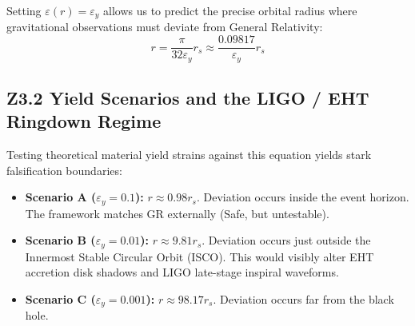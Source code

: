 \documentclass[11pt, letterpaper, openany]{book}
\begin{document}
Setting $\varepsilon(r) = \varepsilon_y$ allows us to predict the precise orbital radius where gravitational observations must deviate from General Relativity:
\[
r = \frac{\pi}{32 \varepsilon_y} r_s \approx \frac{0.09817}{\varepsilon_y} r_s
\]

\vspace{0.3cm}
\begin{center}
\end{center}
\vspace{0.3cm}

\subsection*{Z3.2 Yield Scenarios and the LIGO / EHT Ringdown Regime}

Testing theoretical material yield strains against this equation yields stark falsification boundaries:
\begin{itemize}
    \item \textbf{Scenario A ($\varepsilon_y = 0.1$):} $r \approx 0.98 r_s$. Deviation occurs inside the event horizon. The framework matches GR externally (Safe, but untestable).
    \item \textbf{Scenario B ($\varepsilon_y = 0.01$):} $r \approx 9.81 r_s$. Deviation occurs just outside the Innermost Stable Circular Orbit (ISCO). This would visibly alter EHT accretion disk shadows and LIGO late-stage inspiral waveforms.
    \item \textbf{Scenario C ($\varepsilon_y = 0.001$):} $r \approx 98.17 r_s$. Deviation occurs far from the black hole. 
\end{itemize}
\end{document}
